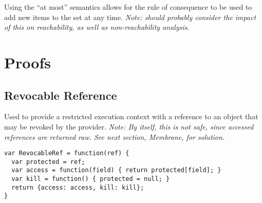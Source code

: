 \documentclass[a4paper]{article}
\begin{document}
Using the ``at most'' semantics allows for the rule of consequence to be used to
add new items to the set at any time. \emph{Note: should probably consider the
impact of this on reachability, as well as non-reachability analysis.}

\section{Proofs}
\subsection{Revocable Reference}
Used to provide a restricted execution context with a reference to an object
that may be revoked by the provider.
\emph{Note: By itself, this is not safe, since accessed references are returned
  raw. See next section, Membrane, for solution.}

\begin{verbatim}
var RevocableRef = function(ref) {
  var protected = ref;
  var access = function(field) { return protected[field]; }
  var kill = function() { protected = null; }
  return {access: access, kill: kill};
}
\end{verbatim}

%
%
\end{document}
